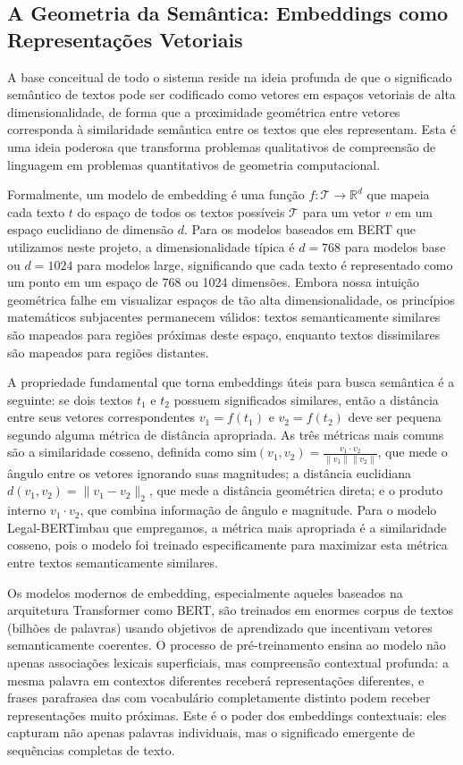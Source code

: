 \documentclass[12pt,a4paper]{article}
\begin{document}
\subsection{A Geometria da Semântica: Embeddings como Representações Vetoriais}

A base conceitual de todo o sistema reside na ideia profunda de que o significado semântico de textos pode ser codificado como vetores em espaços vetoriais de alta dimensionalidade, de forma que a proximidade geométrica entre vetores corresponda à similaridade semântica entre os textos que eles representam. Esta é uma ideia poderosa que transforma problemas qualitativos de compreensão de linguagem em problemas quantitativos de geometria computacional.

Formalmente, um modelo de embedding é uma função $f: \mathcal{T} \rightarrow \mathbb{R}^d$ que mapeia cada texto $t$ do espaço de todos os textos possíveis $\mathcal{T}$ para um vetor $v$ em um espaço euclidiano de dimensão $d$. Para os modelos baseados em BERT que utilizamos neste projeto, a dimensionalidade típica é $d = 768$ para modelos base ou $d = 1024$ para modelos large, significando que cada texto é representado como um ponto em um espaço de 768 ou 1024 dimensões. Embora nossa intuição geométrica falhe em visualizar espaços de tão alta dimensionalidade, os princípios matemáticos subjacentes permanecem válidos: textos semanticamente similares são mapeados para regiões próximas deste espaço, enquanto textos dissimilares são mapeados para regiões distantes.

A propriedade fundamental que torna embeddings úteis para busca semântica é a seguinte: se dois textos $t_1$ e $t_2$ possuem significados similares, então a distância entre seus vetores correspondentes $v_1 = f(t_1)$ e $v_2 = f(t_2)$ deve ser pequena segundo alguma métrica de distância apropriada. As três métricas mais comuns são a similaridade cosseno, definida como $\text{sim}(v_1, v_2) = \frac{v_1 \cdot v_2}{\|v_1\| \|v_2\|}$, que mede o ângulo entre os vetores ignorando suas magnitudes; a distância euclidiana $d(v_1, v_2) = \|v_1 - v_2\|_2$, que mede a distância geométrica direta; e o produto interno $v_1 \cdot v_2$, que combina informação de ângulo e magnitude. Para o modelo Legal-BERTimbau que empregamos, a métrica mais apropriada é a similaridade cosseno, pois o modelo foi treinado especificamente para maximizar esta métrica entre textos semanticamente similares.

Os modelos modernos de embedding, especialmente aqueles baseados na arquitetura Transformer como BERT, são treinados em enormes corpus de textos (bilhões de palavras) usando objetivos de aprendizado que incentivam vetores semanticamente coerentes. O processo de pré-treinamento ensina ao modelo não apenas associações lexicais superficiais, mas compreensão contextual profunda: a mesma palavra em contextos diferentes receberá representações diferentes, e frases parafrasea das com vocabulário completamente distinto podem receber representações muito próximas. Este é o poder dos embeddings contextuais: eles capturam não apenas palavras individuais, mas o significado emergente de sequências completas de texto.
\end{document}
